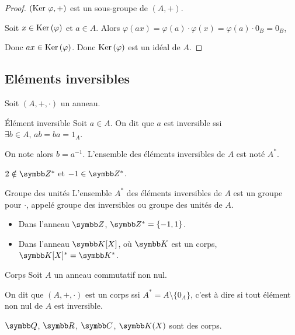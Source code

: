 \begin{proof}
    $(\operatorname{Ker} \, \varphi, +)$ est un sous-groupe de $(A, +)$.

    Soit $x \in \operatorname{Ker} \,(\varphi)$ et $a \in A$. Alors $\varphi(ax) = \varphi(a) \cdot \varphi(x) = \varphi(a) \cdot 0_B = 0_B$,

    Donc $ax \in \operatorname{Ker} \,(\varphi)$.
    Donc $\operatorname{Ker} \,(\varphi)$ est un idéal de $A$.
\end{proof}

\subsection{Eléments inversibles}

Soit $(A, +, \cdot)$ un anneau.

\begin{definition}{Élément inversible}{}
    Soit $a \in A$. On dit que $a$ est inversible ssi $\exists b \in A, \, ab = ba = 1_A$.

    On note alors $b = a^{-1}$. L'ensemble des éléments inversibles de $A$ est noté $A^*$.
\end{definition}

\begin{exemple}
    $2 \notin \Z^*$ et $-1 \in \Z^*$.
\end{exemple}

\begin{theoreme}{Groupe des unités}{}
    L'ensemble $A^*$ des éléments inversibles de $A$ est un groupe pour $\cdot$, appelé 
    groupe des inversibles ou groupe des unités de $A$.
\end{theoreme}

\begin{exemple}
    \begin{itemize}
        \item Dans l'anneau $\Z$, $\Z^* = \{-1, 1\}$.
        \item Dans l'anneau $\K[X]$, où $\K$ est un corps, $\K[X]^* = \K^*$.
    \end{itemize}
\end{exemple}

\begin{definition}{Corps}{}
    Soit $A$ un anneau commutatif non nul. 
    
    On dit que $(A, +, \cdot)$ est un corps 
    ssi $A^* = A \setminus \{0_A\}$, c'est à dire si tout élément non nul de $A$ est inversible.
\end{definition}

\begin{exemple}
    $\Q$, $\R$, $\C$, $\K(X)$ sont des corps.
\end{exemple}

